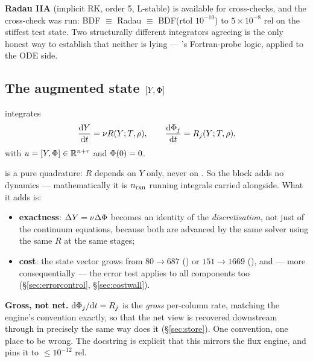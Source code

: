 \textbf{Radau IIA} (implicit RK, order 5, L-stable) is available for
cross-checks, and the cross-check was run: BDF $\equiv$ Radau $\equiv$ BDF(rtol
$10^{-10}$) to \textbf{$5\times10^{-8}$} rel on the stiffest test state.
 Two structurally different integrators agreeing is the
only honest way to establish that neither is lying --- 's
Fortran-probe logic, applied to the ODE side.

\subsection{The augmented state \texorpdfstring{$[Y, \Phi]$}{[Y, Phi]}}
\label{sec:augmented}

 integrates
%
\begin{equation}
\frac{\mathrm{d} Y}{\mathrm{d} t} = \nu R(Y; T,\rho), \qquad
\frac{\mathrm{d}\Phi_j}{\mathrm{d} t} = R_j(Y; T,\rho),
\label{eq:augmented}
\end{equation}
%
with $u = [Y, \Phi] \in \mathbb{R}^{n+r}$ and $\Phi(0) = 0$.

\Phifl{} is a pure quadrature: $R$ depends on $Y$ only, never on \Phifl. So the
\Phifl{} block adds no dynamics --- mathematically it is $n_{\rm rxn}$ running
integrals carried alongside. What it adds is:

\begin{itemize}
\item \textbf{exactness}: $\Delta Y = \nu\Delta\Phi$ becomes an identity of
  the \emph{discretisation}, not just of the continuum equations, because both
  are advanced by the same solver using the same $R$ at the same stages;
\item \textbf{cost}: the state vector grows from $80 \to 687$ () or
  $151 \to 1669$ (), and --- more consequentially --- the error test
  applies to all \Phifl{} components too (\S\ref{sec:errorcontrol},
  \S\ref{sec:costwall}).
\end{itemize}

\textbf{Gross, not net.} $\mathrm{d}\Phi_j/\mathrm{d} t = R_j$ is the \emph{gross}
per-column rate, matching the engine's \fp{} convention exactly, so that the net
view is recovered downstream through  in precisely the same way
 does it (\S\ref{sec:store}). One convention, one place to be
wrong. The docstring is explicit that this mirrors the flux engine, and
 pins it to $\le 10^{-12}$ rel.

